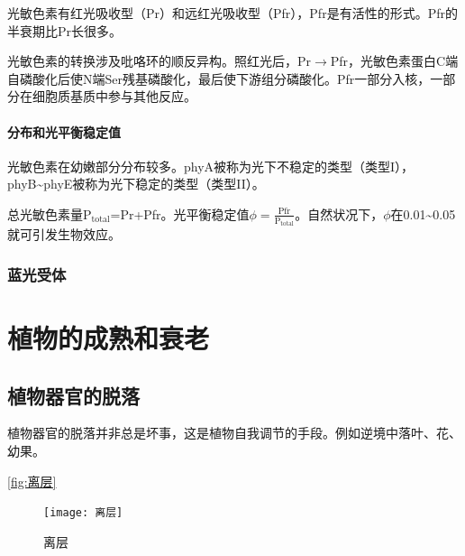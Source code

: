 光敏色素有红光吸收型（Pr）和远红光吸收型（Pfr），Pfr是有活性的形式。Pfr的半衰期比Pr长很多。
\begin{center}
\end{center}
光敏色素的转换涉及吡咯环的顺反异构。照红光后，Pr$\longrightarrow$Pfr，光敏色素蛋白C端自磷酸化后使N端Ser残基磷酸化，最后使下游组分磷酸化。Pfr一部分入核，一部分在细胞质基质中参与其他反应。

\paragraph{分布和光平衡稳定值}

光敏色素在幼嫩部分分布较多。phyA被称为光下不稳定的类型（类型I），phyB\textasciitilde phyE被称为光下稳定的类型（类型II）。

总光敏色素量P$_{\text{total}}$=Pr+Pfr。光平衡稳定值$\phi=\frac{\text{Pfr}}{\text{P}_{\text{total}}}$。自然状况下，$\phi$在0.01\textasciitilde0.05就可引发生物效应。

\subsubsection{蓝光受体}






\section{植物的成熟和衰老}

\subsection{植物器官的脱落}

植物器官的脱落并非总是坏事，这是植物自我调节的手段。例如逆境中落叶、花、幼果。

\autoref{fig:离层}
\begin{figure}[htbp]
	\centering
	\texttt{[image: 离层]}
	\caption{离层}
	\label{fig:离层}
\end{figure}

